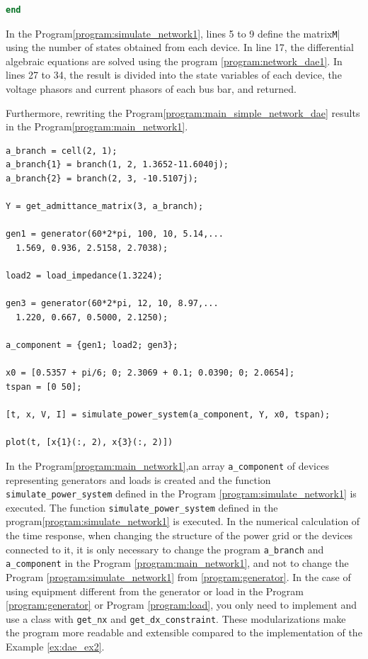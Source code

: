 \documentclass[graybox, envcountchap]{svmult}
\begin{document}
\begin{example}
\begin{lstlisting}[language=Matlab, caption=simulate\_power\_system.m, label={program:simulate_network1}]
end
\end{lstlisting}

In the Program\nobreak\ref{program:simulate_network1}, lines 5 to 9 define the matrix\verb|M|| using the number of states obtained from each device.
In line 17, the differential algebraic equations are solved using the program \nobreak\ref{program:network_dae1}.
In lines 27 to 34, the result is divided into the state variables of each device, the voltage phasors and current phasors of each bus bar, and returned.

Furthermore, rewriting the Program\nobreak\ref{program:main_simple_network_dae} results in the Program\nobreak\ref{program:main_network1}.

\smallskip
\begin{PROGRAMA}[count,title={main\_simulation\_3bus.m}]\label{program:main_network1}
\begin{verbatim}
a_branch = cell(2, 1);
a_branch{1} = branch(1, 2, 1.3652-11.6040j);
a_branch{2} = branch(2, 3, -10.5107j);

Y = get_admittance_matrix(3, a_branch);

gen1 = generator(60*2*pi, 100, 10, 5.14,...
  1.569, 0.936, 2.5158, 2.7038);

load2 = load_impedance(1.3224);

gen3 = generator(60*2*pi, 12, 10, 8.97,...
  1.220, 0.667, 0.5000, 2.1250);

a_component = {gen1; load2; gen3};

x0 = [0.5357 + pi/6; 0; 2.3069 + 0.1; 0.0390; 0; 2.0654];
tspan = [0 50];

[t, x, V, I] = simulate_power_system(a_component, Y, x0, tspan);

plot(t, [x{1}(:, 2), x{3}(:, 2)])
\end{verbatim}
\end{PROGRAMA}

In the Program\nobreak\ref{program:main_network1},an array \verb|a_component| of devices representing generators and loads is created and the function \verb|simulate_power_system| defined in the Program \nobreak\ref{program:simulate_network1} is executed.
The function \verb|simulate_power_system| defined in the program\nobreak\ref{program:simulate_network1} is executed.
In the numerical calculation of the time response, when changing the structure of the power grid or the devices connected to it,
it is only necessary to change the program \verb|a_branch| and \verb|a_component| in the Program \ref{program:main_network1},
and not to change the Program \nobreak\ref{program:simulate_network1} from \nobreak\ref{program:generator}.
In the case of using equipment different from the generator or load in the Program \nobreak\ref{program:generator} or Program \ref{program:load},
you only need to implement and use a class with \verb|get_nx| and \verb|get_dx_constraint|.
These modularizations make the program more readable and extensible compared to the implementation of the Example \ref{ex:dae_ex2}.
\end{example}
\end{document}
